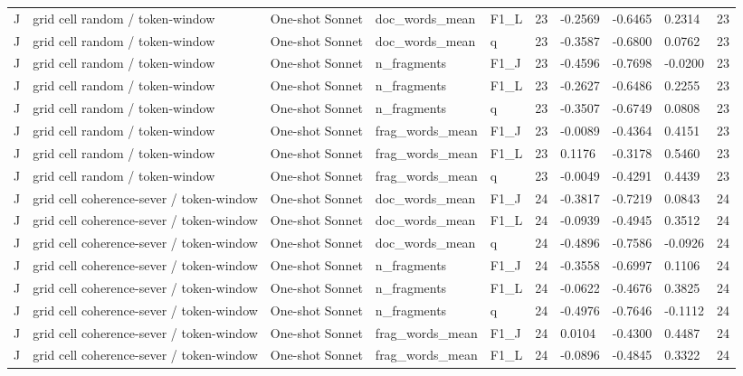 \begin{table}[t]
{\begin{tabular}{llllllllll}
J & grid cell random / token-window & One-shot Sonnet & doc\_words\_mean & F1\_L & 23 & -0.2569 & -0.6465 & 0.2314 & 23 \\
J & grid cell random / token-window & One-shot Sonnet & doc\_words\_mean & q & 23 & -0.3587 & -0.6800 & 0.0762 & 23 \\
J & grid cell random / token-window & One-shot Sonnet & n\_fragments & F1\_J & 23 & -0.4596 & -0.7698 & -0.0200 & 23 \\
J & grid cell random / token-window & One-shot Sonnet & n\_fragments & F1\_L & 23 & -0.2627 & -0.6486 & 0.2255 & 23 \\
J & grid cell random / token-window & One-shot Sonnet & n\_fragments & q & 23 & -0.3507 & -0.6749 & 0.0808 & 23 \\
J & grid cell random / token-window & One-shot Sonnet & frag\_words\_mean & F1\_J & 23 & -0.0089 & -0.4364 & 0.4151 & 23 \\
J & grid cell random / token-window & One-shot Sonnet & frag\_words\_mean & F1\_L & 23 & 0.1176 & -0.3178 & 0.5460 & 23 \\
J & grid cell random / token-window & One-shot Sonnet & frag\_words\_mean & q & 23 & -0.0049 & -0.4291 & 0.4439 & 23 \\
J & grid cell coherence-sever / token-window & One-shot Sonnet & doc\_words\_mean & F1\_J & 24 & -0.3817 & -0.7219 & 0.0843 & 24 \\
J & grid cell coherence-sever / token-window & One-shot Sonnet & doc\_words\_mean & F1\_L & 24 & -0.0939 & -0.4945 & 0.3512 & 24 \\
J & grid cell coherence-sever / token-window & One-shot Sonnet & doc\_words\_mean & q & 24 & -0.4896 & -0.7586 & -0.0926 & 24 \\
J & grid cell coherence-sever / token-window & One-shot Sonnet & n\_fragments & F1\_J & 24 & -0.3558 & -0.6997 & 0.1106 & 24 \\
J & grid cell coherence-sever / token-window & One-shot Sonnet & n\_fragments & F1\_L & 24 & -0.0622 & -0.4676 & 0.3825 & 24 \\
J & grid cell coherence-sever / token-window & One-shot Sonnet & n\_fragments & q & 24 & -0.4976 & -0.7646 & -0.1112 & 24 \\
J & grid cell coherence-sever / token-window & One-shot Sonnet & frag\_words\_mean & F1\_J & 24 & 0.0104 & -0.4300 & 0.4487 & 24 \\
J & grid cell coherence-sever / token-window & One-shot Sonnet & frag\_words\_mean & F1\_L & 24 & -0.0896 & -0.4845 & 0.3322 & 24 \\

\end{tabular}}
\end{table}
